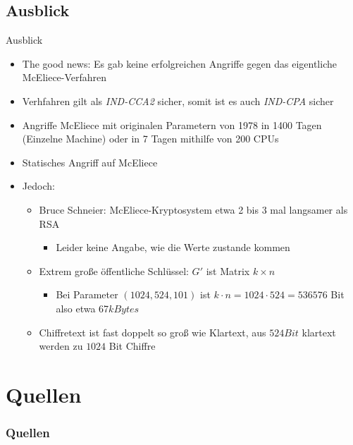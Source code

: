\documentclass[11pt%
,aspectratio=169%
]{beamer}
\begin{document}
\subsection{Ausblick}
\begin{frame}{Ausblick}
    \begin{itemize}
        \item The good news: Es gab keine erfolgreichen Angriffe gegen das eigentliche McEliece-Verfahren
        \item Verhfahren gilt als  \emph{IND-CCA2} \cite{dottling2012cca2} sicher, somit ist es auch \emph{IND-CPA} sicher \cite{nojima2008semantic}
        \item Angriffe McEliece mit originalen Parametern von 1978 in 1400 Tagen (Einzelne Machine) oder in 7 Tagen mithilfe von 200 CPUs \cite{baldi2016enhanced}
        \item Statisches Angriff auf McEliece \cite{canteaut1998cryptanalysis}
        \item Jedoch:
        \begin{itemize}
            \item Bruce Schneier: McEliece-Kryptosystem etwa 2 bis 3 mal langsamer als RSA \cite[S. 479ff]{Schneier2007Applied}
            \begin{itemize}
                \item Leider keine Angabe, wie die Werte zustande kommen
            \end{itemize}
            \item Extrem große öffentliche Schlüssel: $G'$ ist Matrix $k \times n$
            \begin{itemize}
                \item Bei Parameter $(1024,524,101)$ ist $k \cdot n = 1024 \cdot 524 = 536576$ Bit also etwa 67$kBytes$
            \end{itemize}
            \item Chiffretext ist fast doppelt so groß wie Klartext, aus $524 Bit$ klartext werden zu $1024$ Bit Chiffre 
        \end{itemize}
     \end{itemize}
\end{frame}

\section{Quellen}
\appendix
\begin{frame}[allowframebreaks]
  \frametitle<presentation>{Quellen}
\printbibliography
\end{frame}
\end{document}

